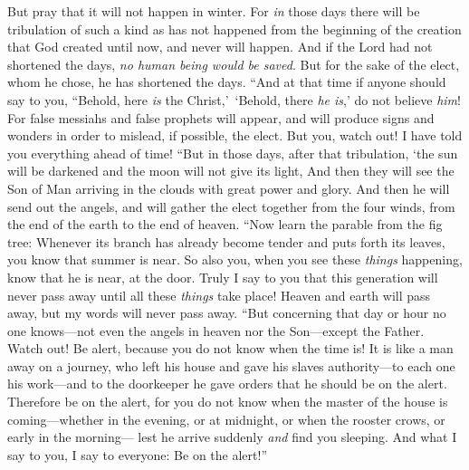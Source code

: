 \begin{biblechapter}
\verse But pray that it will not happen in winter.
\verse For \textit{in} those days there will be tribulation of such a kind as has not happened from the beginning of the creation that God created until now, and never will happen.
\verse And if the Lord had not shortened the days, \textit{no human being would be saved}. But for the sake of the elect, whom he chose, he has shortened the days.
\verse “And at that time if anyone should say to you, “Behold, here \textit{is} the Christ,’ ‘Behold, there \textit{he is},’ do not believe \textit{him}!
\verse For false messiahs and false prophets will appear, and will produce signs and wonders in order to mislead, if possible, the elect.
\verse But you, watch out! I have told you everything ahead of time!
 “But in those days, after that tribulation,
\verse ‘the sun will be darkened 
and the moon will not give its light,
\verse And then they will see the Son of Man arriving in the clouds with great power and glory.
\verse And then he will send out the angels, and will gather the elect together from the four winds, from the end of the earth to the end of heaven.
 “Now learn the parable from the fig tree: Whenever its branch has already become tender and puts forth its leaves, you know that summer is near.
\verse So also you, when you see these \textit{things} happening, know that he is near, at the door.
\verse Truly I say to you that this generation will never pass away until all these \textit{things} take place!
\verse Heaven and earth will pass away, but my words will never pass away.
 “But concerning that day or hour no one knows—not even the angels in heaven nor the Son—except the Father.
\verse Watch out! Be alert, because you do not know when the time is!
\verse It is like a man away on a journey, who left his house and gave his slaves authority—to each one his work—and to the doorkeeper he gave orders that he should be on the alert.
\verse Therefore be on the alert, for you do not know when the master of the house is coming—whether in the evening, or at midnight, or when the rooster crows, or early in the morning—
\verse lest he arrive suddenly \textit{and} find you sleeping.
\verse And what I say to you, I say to everyone: Be on the alert!”
\end{biblechapter}

